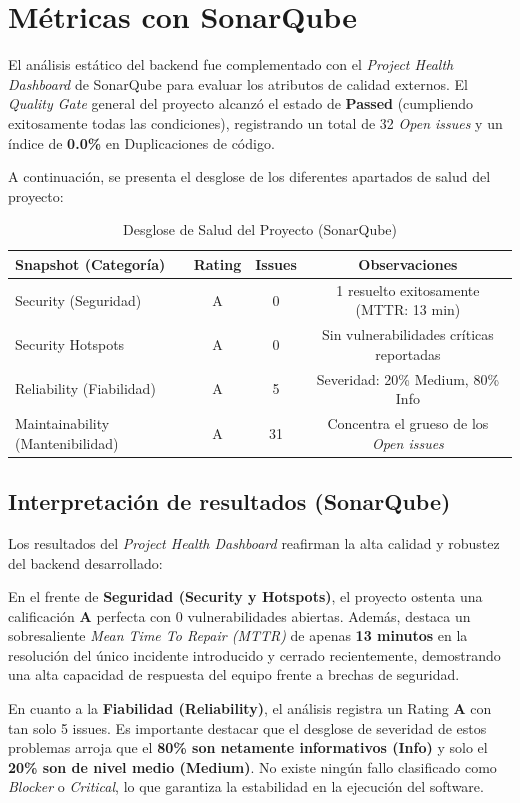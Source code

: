 \documentclass[12pt, a4paper]{article}
\begin{document}
\section{Métricas con SonarQube}
El análisis estático del backend fue complementado con el \textit{Project Health Dashboard} de SonarQube para evaluar los atributos de calidad externos. El \textit{Quality Gate} general del proyecto alcanzó el estado de \textbf{Passed} (cumpliendo exitosamente todas las condiciones), registrando un total de 32 \textit{Open issues} y un índice de \textbf{0.0\%} en Duplicaciones de código.

A continuación, se presenta el desglose de los diferentes apartados de salud del proyecto:

\begin{table}[H]
  \centering
  \begin{tabular}{lccc}
    \toprule
    \textbf{Snapshot (Categoría)} & \textbf{Rating} & \textbf{Issues} & \textbf{Observaciones} \\
    \midrule
    Security (Seguridad) & A & 0 & 1 resuelto exitosamente (MTTR: 13 min) \\
    Security Hotspots & A & 0 & Sin vulnerabilidades críticas reportadas \\
    Reliability (Fiabilidad) & A & 5 & Severidad: 20\% Medium, 80\% Info \\
    Maintainability (Mantenibilidad) & A & 31 & Concentra el grueso de los \textit{Open issues} \\
    \bottomrule
  \end{tabular}
  \caption{Desglose de Salud del Proyecto (SonarQube)}
\end{table}

\subsection{Interpretación de resultados (SonarQube)}
Los resultados del \textit{Project Health Dashboard} reafirman la alta calidad y robustez del backend desarrollado:

En el frente de \textbf{Seguridad (Security y Hotspots)}, el proyecto ostenta una calificación \textbf{A} perfecta con 0 vulnerabilidades abiertas. Además, destaca un sobresaliente \textit{Mean Time To Repair (MTTR)} de apenas \textbf{13 minutos} en la resolución del único incidente introducido y cerrado recientemente, demostrando una alta capacidad de respuesta del equipo frente a brechas de seguridad.

En cuanto a la \textbf{Fiabilidad (Reliability)}, el análisis registra un Rating \textbf{A} con tan solo 5 issues. Es importante destacar que el desglose de severidad de estos problemas arroja que el \textbf{80\% son netamente informativos (Info)} y solo el \textbf{20\% son de nivel medio (Medium)}. No existe ningún fallo clasificado como \textit{Blocker} o \textit{Critical}, lo que garantiza la estabilidad en la ejecución del software.
\end{document}

